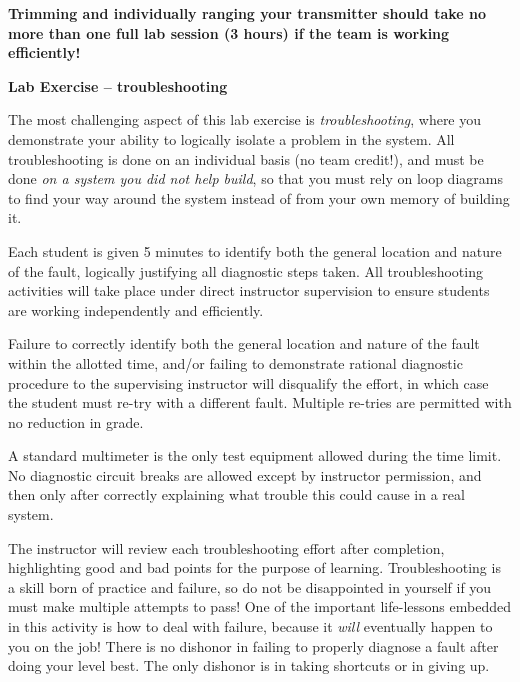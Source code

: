 \vskip 10pt

{\bf Trimming and individually ranging your transmitter should take no more than one full lab session (3 hours) if the team is working efficiently!}





\vfil \eject

\noindent
{\bf Lab Exercise -- troubleshooting}

\vskip 5pt

The most challenging aspect of this lab exercise is {\it troubleshooting}, where you demonstrate your ability to logically isolate a problem in the system.  All troubleshooting is done on an individual basis (no team credit!), and must be done {\it on a system you did not help build}, so that you must rely on loop diagrams to find your way around the system instead of from your own memory of building it.

Each student is given 5 minutes to identify both the general location and nature of the fault, logically justifying all diagnostic steps taken.  All troubleshooting activities will take place under direct instructor supervision to ensure students are working independently and efficiently. 

Failure to correctly identify both the general location and nature of the fault within the allotted time, and/or failing to demonstrate rational diagnostic procedure to the supervising instructor will disqualify the effort, in which case the student must re-try with a different fault.  Multiple re-tries are permitted with no reduction in grade.

A standard multimeter is the only test equipment allowed during the time limit.  No diagnostic circuit breaks are allowed except by instructor permission, and then only after correctly explaining what trouble this could cause in a real system.  

The instructor will review each troubleshooting effort after completion, highlighting good and bad points for the purpose of learning.  Troubleshooting is a skill born of practice and failure, so do not be disappointed in yourself if you must make multiple attempts to pass!  One of the important life-lessons embedded in this activity is how to deal with failure, because it {\it will} eventually happen to you on the job!  There is no dishonor in failing to properly diagnose a fault after doing your level best.  The only dishonor is in taking shortcuts or in giving up.

\vskip 10pt

